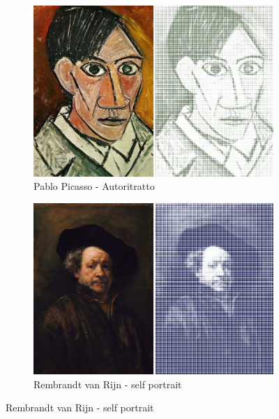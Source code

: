\begin{figure}[H]
    \begin{subfigure}[b]{0.45\textwidth}
        \centering
        \includegraphics[width=\textwidth]{Figures/day_1/picasso.png}
        \caption{Pablo Picasso - Autoritratto}
    \end{subfigure}
    \hspace{1cm}
    \begin{subfigure}[b]{0.45\textwidth}
        \centering

        \includegraphics[width=\textwidth]{Figures/day_1/rembrandt.png}
        \caption{Rembrandt van Rijn - self portrait}
    \end{subfigure}


\end{figure}

